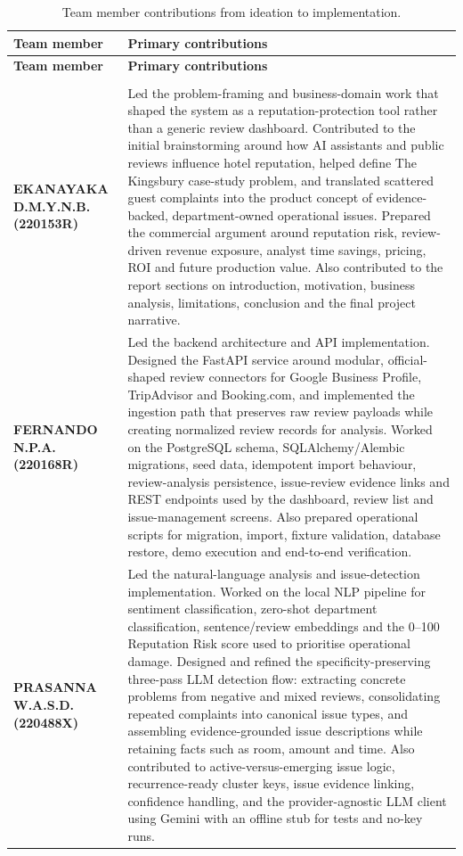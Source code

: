 \documentclass[11pt,a4paper]{article}
\begin{document}
\renewcommand{\arraystretch}{1.28}
\begin{longtable}{>{\bfseries}p{4.0cm}p{10.8cm}}
\caption{Team member contributions from ideation to implementation.}
\label{tab:contributions}\\
\toprule
\textbf{Team member} & \textbf{Primary contributions} \\
\midrule
\endfirsthead
\toprule
\textbf{Team member} & \textbf{Primary contributions} \\
\midrule
\endhead
\midrule
\multicolumn{2}{r}{\small Continued on next page} \\
\bottomrule
\endfoot
\bottomrule
\endlastfoot
EKANAYAKA D.M.Y.N.B. (220153R) &
Led the problem-framing and business-domain work that shaped the system as a reputation-protection
tool rather than a generic review dashboard. Contributed to the initial brainstorming around how AI
assistants and public reviews influence hotel reputation, helped define The Kingsbury case-study
problem, and translated scattered guest complaints into the product concept of evidence-backed,
department-owned operational issues. Prepared the commercial argument around reputation risk,
review-driven revenue exposure, analyst time savings, pricing, ROI and future production value. Also
contributed to the report sections on introduction, motivation, business analysis, limitations,
conclusion and the final project narrative. \\

FERNANDO N.P.A. (220168R) &
Led the backend architecture and API implementation. Designed the FastAPI service around modular,
official-shaped review connectors for Google Business Profile, TripAdvisor and Booking.com, and
implemented the ingestion path that preserves raw review payloads while creating normalized review
records for analysis. Worked on the PostgreSQL schema, SQLAlchemy/Alembic migrations, seed data,
idempotent import behaviour, review-analysis persistence, issue-review evidence links and REST
endpoints used by the dashboard, review list and issue-management screens. Also prepared operational
scripts for migration, import, fixture validation, database restore, demo execution and end-to-end
verification. \\

PRASANNA W.A.S.D. (220488X) &
Led the natural-language analysis and issue-detection implementation. Worked on the local NLP pipeline
for sentiment classification, zero-shot department classification, sentence/review embeddings and the
0--100 Reputation Risk score used to prioritise operational damage. Designed and refined the
specificity-preserving three-pass LLM detection flow: extracting concrete problems from negative and
mixed reviews, consolidating repeated complaints into canonical issue types, and assembling
evidence-grounded issue descriptions while retaining facts such as room, amount and time. Also
contributed to active-versus-emerging issue logic, recurrence-ready cluster keys, issue evidence
linking, confidence handling, and the provider-agnostic LLM client using Gemini with an offline stub
for tests and no-key runs. \\


\end{longtable}
\end{document}
